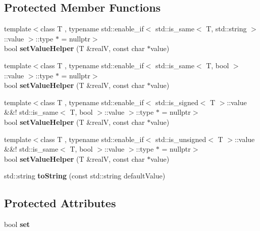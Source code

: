 \subsection*{Protected Member Functions}
\begin{DoxyCompactItemize}
\item 
\hypertarget{class_option_base_a91c9f6d8694c4267e7d0698a3f81b7a6}{}\label{class_option_base_a91c9f6d8694c4267e7d0698a3f81b7a6} 
{\footnotesize template$<$class T , typename std\+::enable\+\_\+if$<$ std\+::is\+\_\+same$<$ T, std\+::string $>$\+::value $>$\+::type $\ast$  = nullptr$>$ }\\bool {\bfseries set\+Value\+Helper} (T \&realV, const char $\ast$value)
\item 
\hypertarget{class_option_base_a91c9f6d8694c4267e7d0698a3f81b7a6}{}\label{class_option_base_a91c9f6d8694c4267e7d0698a3f81b7a6} 
{\footnotesize template$<$class T , typename std\+::enable\+\_\+if$<$ std\+::is\+\_\+same$<$ T, bool $>$\+::value $>$\+::type $\ast$  = nullptr$>$ }\\bool {\bfseries set\+Value\+Helper} (T \&realV, const char $\ast$value)
\item 
\hypertarget{class_option_base_a91c9f6d8694c4267e7d0698a3f81b7a6}{}\label{class_option_base_a91c9f6d8694c4267e7d0698a3f81b7a6} 
{\footnotesize template$<$class T , typename std\+::enable\+\_\+if$<$ std\+::is\+\_\+signed$<$ T $>$\+::value \&\&! std\+::is\+\_\+same$<$ T, bool $>$\+::value $>$\+::type $\ast$  = nullptr$>$ }\\bool {\bfseries set\+Value\+Helper} (T \&realV, const char $\ast$value)
\item 
\hypertarget{class_option_base_a91c9f6d8694c4267e7d0698a3f81b7a6}{}\label{class_option_base_a91c9f6d8694c4267e7d0698a3f81b7a6} 
{\footnotesize template$<$class T , typename std\+::enable\+\_\+if$<$ std\+::is\+\_\+unsigned$<$ T $>$\+::value \&\&! std\+::is\+\_\+same$<$ T, bool $>$\+::value $>$\+::type $\ast$  = nullptr$>$ }\\bool {\bfseries set\+Value\+Helper} (T \&realV, const char $\ast$value)
\item 
\hypertarget{class_option_base_a4eaffeb0bb14c986a99209240985dec1}{}\label{class_option_base_a4eaffeb0bb14c986a99209240985dec1} 
std\+::string {\bfseries to\+String} (const std\+::string default\+Value)
\end{DoxyCompactItemize}
\subsection*{Protected Attributes}
\begin{DoxyCompactItemize}
\item 
\hypertarget{class_option_base_a120e0c3f781c5894a8a2e95ed4ed21fd}{}\label{class_option_base_a120e0c3f781c5894a8a2e95ed4ed21fd} 
bool {\bfseries set}
\end{DoxyCompactItemize}


